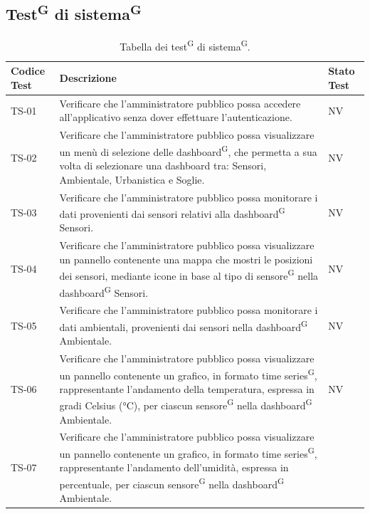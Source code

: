 \documentclass[8pt]{article}
\newcommand{\glossterm}[1]{#1\textsuperscript{G}} %
\begin{document}
\subsection{\glossterm{Test} di \glossterm{sistema}}
\renewcommand{\arraystretch}{2.5}
\begin{longtable}{|>{\centering}p{2cm}|>{\RaggedRight}m{12cm}|>{\centering\arraybackslash}p{2cm}|}
    \hline
    \rowcolor{white}
    \textbf{Codice Test} & \textbf{Descrizione} & \textbf{Stato Test} \\
    \hline
    \endfirsthead 
    \rowcolor{white}
    \caption{Tabella dei \glossterm{test} di \glossterm{sistema}.} 
    \label{table:Tabella dei test di sistema}
    \endlastfoot 
    TS-01 & Verificare che l'amministratore pubblico possa accedere all'applicativo
    senza dover effettuare l'autenticazione. & NV\\
    \hline
    TS-02 & Verificare che l'amministratore pubblico possa visualizzare un menù di selezione delle
    \glossterm{dashboard}, che permetta a sua volta di selezionare una dashboard tra: Sensori, Ambientale, Urbanistica e Soglie. & NV\\
    \hline
    TS-03 & Verificare che l'amministratore pubblico possa monitorare i dati
    provenienti dai sensori relativi alla \glossterm{dashboard} Sensori.
    & NV \\
    \hline
    TS-04 & Verificare che l'amministratore pubblico possa visualizzare un pannello
    contenente una mappa che mostri le posizioni dei sensori, mediante icone in base al tipo di \glossterm{sensore} nella \glossterm{dashboard} Sensori.
    & NV \\
    \hline
    TS-05 & Verificare che l'amministratore pubblico possa monitorare i dati ambientali, provenienti
    dai sensori nella \glossterm{dashboard} Ambientale.
    & NV \\
    \hline
    TS-06 & Verificare che l'amministratore pubblico possa visualizzare un pannello
    contenente un grafico, in formato \glossterm{time series}, rappresentante l'andamento della temperatura,
    espressa in gradi Celsius (°C), per ciascun \glossterm{sensore} nella \glossterm{dashboard} Ambientale.
    & NV \\
    \hline
    TS-07 & Verificare che l'amministratore pubblico possa visualizzare un pannello
    contenente un grafico, in formato \glossterm{time series}, rappresentante l'andamento dell'umidità, espressa
    in percentuale, per ciascun \glossterm{sensore} nella \glossterm{dashboard} Ambientale.

\end{longtable}
\end{document}
